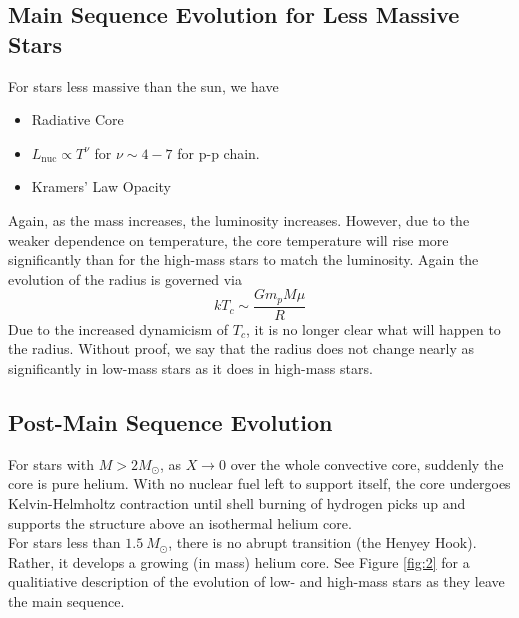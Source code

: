 \documentclass[10pt]{article}
\numberwithin{equation}{section}
\newcommand{\n}{\noindent}
\newcommand{\figref}[1]{Figure \ref{#1}}
\begin{document}
    \subsection{Main Sequence Evolution for Less Massive Stars}
    \label{sec:main-sequ-evol-1}

    For stars less massive than the sun, we have
    \begin{itemize}
    \item Radiative Core
    \item $L_{\mathrm{nuc}}\propto T^\nu$ for $\nu\sim 4-7$ for p-p
      chain.
      \item Kramers' Law Opacity
    \end{itemize}
    Again, as the mass increases, the luminosity increases. However,
    due to the weaker dependence on temperature, the core temperature
    will rise more significantly than for the high-mass stars to match
    the luminosity. Again the evolution of the radius is governed via
    \begin{equation}
      \label{eq:239}
      kT_c\sim\frac{Gm_pM\mu}{R}
    \end{equation}
    Due to the increased dynamicism of $T_c$, it is no longer clear
    what will happen to the radius. Without proof, we say that the
    radius does not change nearly as significantly in low-mass stars
    as it does in high-mass stars.

    \subsection{Post-Main Sequence Evolution}
    \label{sec:post-main-sequence}

    For stars with $M>2M_\odot$, as $X\to 0$ over the whole
    convective core, suddenly the core is pure helium. With no nuclear fuel
    left to support itself, the core undergoes Kelvin-Helmholtz contraction
    until shell burning of hydrogen picks up and supports the structure above
    an isothermal helium core.\\
    
    \n For stars less than $1.5\ M_\odot$, there is no abrupt transition (the
    Henyey Hook). Rather, it develops a growing (in mass) helium core. See
    \figref{fig:2} for a qualitiative description of the evolution of low- and
    high-mass stars as they leave the main sequence.
\end{document}
